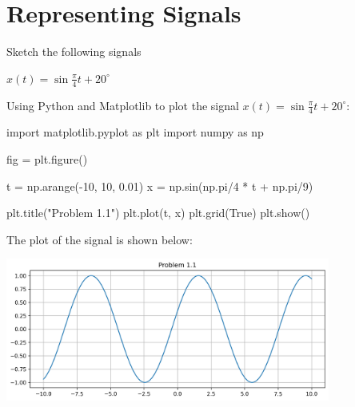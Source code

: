 \documentclass[a4paper, 10pt]{article}
\begin{document}
\subject[2110203 - Computer Engineering Mathematics II]


\section{Representing Signals}



\begin{problem}
Sketch the following signals
\end{problem}


\begin{tosubmit}
\begin{subproblems}
    \item \( x(t) = \sin\frac{\pi}{4} t + 20^\circ \)
\end{subproblems}

\begin{solution}
Using Python and Matplotlib to plot the signal \( x(t) = \sin\frac{\pi}{4} t + 20^\circ \):
\begin{codingbox}
import matplotlib.pyplot as plt
import numpy as np

fig = plt.figure()

t = np.arange(-10, 10, 0.01)
x = np.sin(np.pi/4 * t + np.pi/9)

plt.title("Problem 1.1")
plt.plot(t, x)
plt.grid(True)
plt.show()
\end{codingbox}

The plot of the signal is shown below:
\begin{center}
    \includegraphics[width=0.8\textwidth]{images/problem_1_1.png}
\end{center}
\end{solution}
\end{tosubmit}
\end{document}
